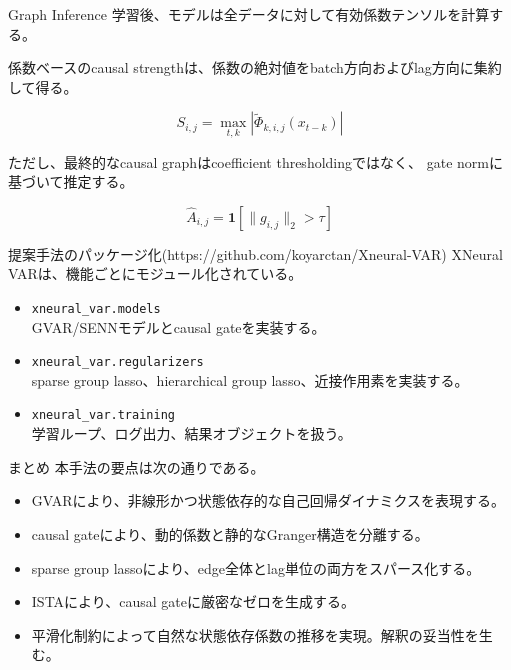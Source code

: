 \documentclass[dvipdfmx,11pt]{beamer}
\begin{document}
\begin{frame}{Graph Inference}
  学習後、モデルは全データに対して有効係数テンソルを計算する。

  係数ベースのcausal strengthは、係数の絶対値をbatch方向およびlag方向に集約して得る。

  \[
    S_{i,j}
    =
    \max_{t,k}
    \left|
      \tilde{\Phi}_{k,i,j}(x_{t-k})
    \right|
  \]

  ただし、最終的なcausal graphはcoefficient thresholdingではなく、
  gate normに基づいて推定する。

  \[
    \hat{A}_{i,j}
    =
    \mathbf{1}
    \left[
      \|g_{i,j}\|_2 > \tau
    \right]
  \]
\end{frame}

\begin{frame}{提案手法のパッケージ化(https://github.com/koyarctan/Xneural-VAR)}
  XNeural VARは、機能ごとにモジュール化されている。

  \begin{itemize}
    \item \texttt{xneural\_var.models}\\
    GVAR/SENNモデルとcausal gateを実装する。
    \item \texttt{xneural\_var.regularizers}\\
    sparse group lasso、hierarchical group lasso、近接作用素を実装する。
    \item \texttt{xneural\_var.training}\\
    学習ループ、ログ出力、結果オブジェクトを扱う。
  \end{itemize}
\end{frame}

\begin{frame}{まとめ}
  本手法の要点は次の通りである。

  \begin{itemize}
    \item GVARにより、非線形かつ状態依存的な自己回帰ダイナミクスを表現する。
    \item causal gateにより、動的係数と静的なGranger構造を分離する。
    \item sparse group lassoにより、edge全体とlag単位の両方をスパース化する。
    \item ISTAにより、causal gateに厳密なゼロを生成する。
    \item 平滑化制約によって自然な状態依存係数の推移を実現。解釈の妥当性を生む。
  \end{itemize}
\end{frame}
\end{document}
